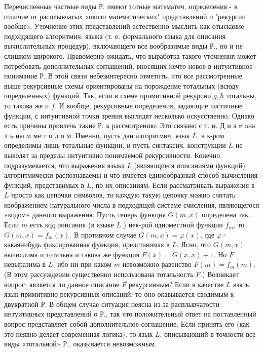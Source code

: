 \documentclass[10pt]{article}
\begin{document}
Перечисленные частные виды Р. имеют тотные математич. определения - в отличие от расплывчатых «около математических" представлений о "рекурсии вообще». Уточнение этих представлений естественно мыслить как отыскание подходящего алгоритмич. языка (т. е. формального языка для описания вычислительных процедур), включающего все вообразимые виды Р., но и не слишком широкого. Правомерно ожидать, что выработка такого уточнения может потребовать дополнительных соглашений, вносящих нечто новое в интуитивное понимание Р. В этой связи небезинтересно отметить, что все рассмотренные выше рекурсивные схемы ориентированы на порождение тотальных (всюду определенных) функций. Так, если в схеме примитивной рекурсии $g, h$ тотальны, то такова же и $f$. И вообще, рекурсивные определения, задающие частичные функции, с интуитивной точки зрения выглядят несколько искусственно. Однако есть причины привлечь такие Р. к рассмотрению. Это связано с т. н. Д и а $\mathbf{r}$ oна л ь ны м ме т о д о м. Именно, пусть дан алгоритмич. язык $L$, в к-ром определимы лишь тотальные функции, и пусть синтаксич. конструкции $L$ не выводят за пределы интуитивно понимаемой рекурсивности. Конечно подразумевается, что выражения языка $L$ (являющиеся описаниями функций) алгоритмически распознаваемы и что имеется единообразный способ вычисления функций, представимых в $L$, по их описаниям. Если рассматривать выражения в $L$ просто как цепочки символов, то каждую такую цепочку можно считать изображением натурального числа в подходящей системе счисления, являющегося «кодом» данного выражения. Пусть теперь функция $G(m, x)$ определена так. Если $m$ есть код описания (в языке $L$ ) нек-рой одноместной функции $f_{m}$, то $G(m, x)=f_{m}(x)$. В противном случае $G(m, x)=\varphi(x)$, где $\varphi$ - какаянибудь фиксированная функция, представимая в $L$. Ясно, что $G(m, x)$ вычислима и тотальна и такова же функция $F(x)=G(x, x)+1$. Но $F$ невыразима в $L$, ибо ни при каком $m$ невозможно равенство $F(m)=f_{m}(m)$. (В этом рассуждении существенно использована тотальность $F$.) Возникает вопрос: является ли данное описание $F$ рекурсивным? Если в качестве $L$ взять язык примитивно рекурсивных описаний, то оно окавывается сводимым к двукратной Р. В общем случае ситуация неясна из-за расплывчатости интуитивных представлений о Р., так что положительный ответ на поставленный вопрос представляет собой дополнительное соглашение. Если принять его (как это неявно делает современная логика), то язык $L$, описывающий в точности все виды «тотальной» Р., оказывается невозможным.
\end{document}
